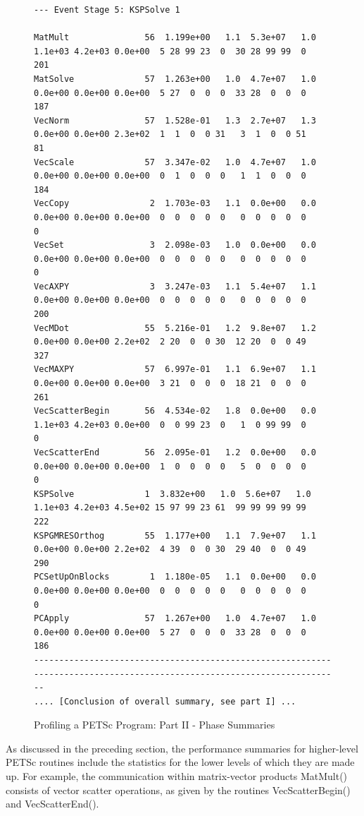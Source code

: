 \begin{figure}[tb]
{\begin{verbatim}
--- Event Stage 5: KSPSolve 1

MatMult               56  1.199e+00   1.1  5.3e+07   1.0  1.1e+03 4.2e+03 0.0e+00  5 28 99 23  0  30 28 99 99  0   201
MatSolve              57  1.263e+00   1.0  4.7e+07   1.0  0.0e+00 0.0e+00 0.0e+00  5 27  0  0  0  33 28  0  0  0   187
VecNorm               57  1.528e-01   1.3  2.7e+07   1.3  0.0e+00 0.0e+00 2.3e+02  1  1  0  0 31   3  1  0  0 51    81
VecScale              57  3.347e-02   1.0  4.7e+07   1.0  0.0e+00 0.0e+00 0.0e+00  0  1  0  0  0   1  1  0  0  0   184
VecCopy                2  1.703e-03   1.1  0.0e+00   0.0  0.0e+00 0.0e+00 0.0e+00  0  0  0  0  0   0  0  0  0  0     0
VecSet                 3  2.098e-03   1.0  0.0e+00   0.0  0.0e+00 0.0e+00 0.0e+00  0  0  0  0  0   0  0  0  0  0     0
VecAXPY                3  3.247e-03   1.1  5.4e+07   1.1  0.0e+00 0.0e+00 0.0e+00  0  0  0  0  0   0  0  0  0  0   200
VecMDot               55  5.216e-01   1.2  9.8e+07   1.2  0.0e+00 0.0e+00 2.2e+02  2 20  0  0 30  12 20  0  0 49   327
VecMAXPY              57  6.997e-01   1.1  6.9e+07   1.1  0.0e+00 0.0e+00 0.0e+00  3 21  0  0  0  18 21  0  0  0   261
VecScatterBegin       56  4.534e-02   1.8  0.0e+00   0.0  1.1e+03 4.2e+03 0.0e+00  0  0 99 23  0   1  0 99 99  0     0
VecScatterEnd         56  2.095e-01   1.2  0.0e+00   0.0  0.0e+00 0.0e+00 0.0e+00  1  0  0  0  0   5  0  0  0  0     0
KSPSolve              1  3.832e+00   1.0  5.6e+07   1.0  1.1e+03 4.2e+03 4.5e+02 15 97 99 23 61  99 99 99 99 99   222
KSPGMRESOrthog        55  1.177e+00   1.1  7.9e+07   1.1  0.0e+00 0.0e+00 2.2e+02  4 39  0  0 30  29 40  0  0 49   290
PCSetUpOnBlocks        1  1.180e-05   1.1  0.0e+00   0.0  0.0e+00 0.0e+00 0.0e+00  0  0  0  0  0   0  0  0  0  0     0
PCApply               57  1.267e+00   1.0  4.7e+07   1.0  0.0e+00 0.0e+00 0.0e+00  5 27  0  0  0  33 28  0  0  0   186
------------------------------------------------------------------------------------------------------------------------
.... [Conclusion of overall summary, see part I] ...
\end{verbatim}
}
\caption{Profiling a PETSc Program: Part II - Phase Summaries}
\label{fig_exparprof2}
\end{figure}

As discussed in the preceding section, the performance summaries for
higher-level PETSc routines include the statistics for the lower
levels of which they are made up.  For example, the communication within
matrix-vector products MatMult() consists of vector scatter
operations, as given by the routines VecScatterBegin() and VecScatterEnd(). 
%
%

